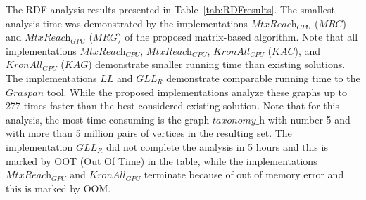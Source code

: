 The RDF analysis results presented in Table~\ref{tab:RDFresults}. The smallest analysis time was demonstrated by the implementations $\textit{MtxReach}_{\textit{CPU}}$ ($\textit{MRC}$) and $\textit{MtxReach}_{\textit{GPU}}$ ($\textit{MRG}$) of the proposed matrix-based algorithm. Note that all implementations $\textit{MtxReach}_{\textit{CPU}}$, $\textit{MtxReach}_{\textit{GPU}}$, $\textit{KronAll}_{\textit{CPU}}$ ($\textit{KAC}$), and $\textit{KronAll}_{\textit{GPU}}$ ($\textit{KAG}$) demonstrate smaller running time than existing solutions. The implementations $\textit{LL}$ and $\textit{GLL}_{\textit{R}}$ demonstrate comparable running time to the $\textit{Graspan}$ tool. While the proposed implementations analyze these graphs up to 277 times faster than the best considered existing solution. Note that for this analysis, the most time-consuming is the graph $\textit{taxonomy\_h}$ with number 5 and with more than 5 million pairs of vertices in the resulting set. The implementation $\textit{GLL}_{\textit{R}}$ did not complete the analysis in 5 hours and this is marked by OOT (Out Of Time) in the table, while the implementations $\textit{MtxReach}_{\textit{GPU}}$ and $\textit{KronAll}_{\textit{GPU}}$ terminate because of out of memory error and this is marked by OOM.

